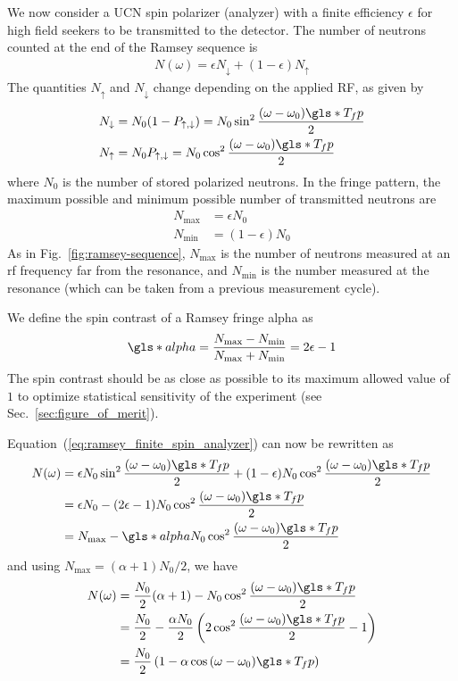 We now consider a UCN spin polarizer (analyzer) with a finite efficiency $\epsilon$ for high field seekers to be transmitted to the detector. The number of neutrons counted at the end of the Ramsey sequence is
%
\begin{gather}
    N(\omega)= \epsilon N_\downarrow + (1 - \epsilon) N_\uparrow \label{eq:ramsey_finite_spin_analyzer}
\end{gather}
%
The quantities $N_\uparrow$ and $N_\downarrow$ change depending on the applied RF, as given by
%
\begin{align}
    N_\downarrow &= N_0 (1- P_{\uparrow,\downarrow} ) = N_0 \sin^2\frac{(\omega - \omega_0)\gls*{T_fp}}{2} \\
    N_\uparrow &= N_0 P_{\uparrow,\downarrow} = N_0 \cos^2\frac{(\omega - \omega_0)\gls*{T_fp}}{2}
\end{align}
%
where $N_0$ is the number of stored polarized neutrons. In the fringe pattern, the maximum possible and minimum possible number of transmitted neutrons are
%
\begin{align}
    N_\text{max} &= \epsilon N_0\\
    N_\text{min} &= (1-\epsilon) N_0
\end{align}
%
As in Fig.~\ref{fig:ramsey-sequence}, $N_\text{max}$ is the number of neutrons measured at an \acrshort*{rf} frequency far from the resonance, and $N_\text{min}$ is the number measured at the resonance (which can be taken from a previous measurement cycle). 

We define the spin contrast of a Ramsey fringe \gls*{alpha} as
%
\begin{gather}
    \gls*{alpha} = \frac{N_\text{max} - N_\text{min}} {N_\text{max} + N_\text{min}} = 2\epsilon - 1 \label{eq:alpha}
\end{gather}
%
The spin contrast should be as close as possible to its maximum allowed value of $1$ to optimize statistical sensitivity of the experiment (see Sec.~\ref{sec:figure_of_merit}).

Equation~(\ref{eq:ramsey_finite_spin_analyzer}) can now be rewritten as
%
\begin{align}
    N(\omega) &= \epsilon N_0\sin^2 \frac{(\omega - \omega_0)\gls*{T_fp}}{2} + (1-\epsilon) N_0 \cos^2 \frac{(\omega - \omega_0)\gls*{T_fp}}{2} \\
    &= \epsilon N_0 - (2\epsilon - 1)N_0 \cos^2 \frac{(\omega - \omega_0)\gls*{T_fp}}{2} \\
    &= N_\text{max} - \gls*{alpha} N_0 \cos^2 \frac{(\omega - \omega_0)\gls*{T_fp}}{2}
\end{align}
%
and using $N_\text{max}=(\alpha + 1)N_0/2$, we have
%
\begin{align}
    N(\omega) &= \frac{N_0}{2}(\alpha + 1) - N_0\cos^2 \frac{(\omega - \omega_0)\gls*{T_fp}}{2} \\
    &= \frac{N_0}{2} - \frac{\alpha N_0}{2}\left( 2\cos^2 \frac{(\omega - \omega_0)\gls*{T_fp}}{2}-1\right) \\
    &= \frac{N_0}{2} \left( 1 - \alpha \cos\,(\omega - \omega_0)\gls*{T_fp} \right) \label{eq:ramsey_fringe_modulation_N_cos}
\end{align}


